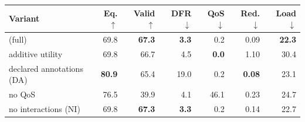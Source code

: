\begin{tabular}{lrrrrrr}\toprule
Variant & Eq. $\uparrow$ & Valid $\uparrow$ & DFR $\downarrow$ & QoS $\downarrow$ & Red. $\downarrow$ & Load $\downarrow$ \\ \midrule
\sysname{} (full) & 69.8 & \textbf{67.3} & \textbf{3.3} & 0.2 & 0.09 & \textbf{22.3} \\
additive utility & 69.8 & 66.7 & 4.5 & \textbf{0.0} & 1.10 & 30.4 \\
declared annotations (DA) & \textbf{80.9} & 65.4 & 19.0 & 0.2 & \textbf{0.08} & 23.1 \\
no QoS & 76.5 & 39.9 & 4.1 & 46.1 & 0.23 & 24.7 \\
no interactions (NI) & 69.8 & \textbf{67.3} & \textbf{3.3} & 0.2 & 0.14 & 22.7 \\
\bottomrule\end{tabular}
